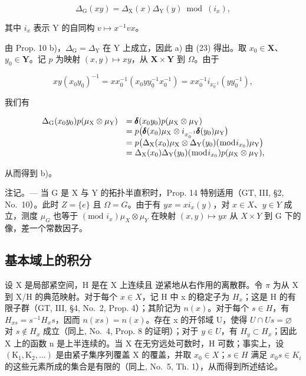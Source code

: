 \[
\Delta_ {\mathrm{G}} (x y) = \Delta_ {\mathrm{X}} (x) \Delta_ {\mathrm{Y}} (y) \bmod (i _ {x}),
\]

其中 \(i_x\) 表示 Y 的自同构 \(v \mapsto x^{-1}vx\)。

由 Prop. 10 b)，\(\Delta_{\mathrm{G}} = \Delta_{\mathrm{Y}}\) 在 Y 上成立，因此 a) 由 (23) 得出。取 \(x_0 \in \mathbf{X}\)、\(y_0 \in \mathbf{Y}\)。记 \(p\) 为映射 \((x, y) \mapsto xy\)，从 \(\mathbf{X} \times \mathbf{Y}\) 到 \(\Omega\)。由于

\[
x y \left(x _ {0} y _ {0}\right) ^ {- 1} = x x _ {0} ^ {- 1} \left(x _ {0} y y _ {0} ^ {- 1} x _ {0} ^ {- 1}\right) = x x _ {0} ^ {- 1} i _ {x _ {0} ^ {- 1}} \left(y y _ {0} ^ {- 1}\right),
\]

我们有

\[
\begin{array}{r l} \Delta_ {\mathrm{G}} (x _ {0} y _ {0}) p (\mu_ {\mathrm{X}} \otimes \mu_ {\mathrm{Y}}) & = \pmb {\delta} (x _ {0} y _ {0}) p (\mu_ {\mathrm{X}} \otimes \mu_ {\mathrm{Y}}) \\ & = p \big (\pmb {\delta} (x _ {0}) \mu_ {\mathrm{X}} \otimes i _ {x _ {0} ^ {- 1}} \pmb {\delta} (y _ {0}) \mu_ {\mathrm{Y}} \big) \\ & = p \big (\Delta_ {\mathrm{X}} (x _ {0}) \mu_ {\mathrm{X}} \otimes \Delta_ {\mathrm{Y}} (y _ {0}) (\bmod i _ {x _ {0}}) \mu_ {\mathrm{Y}} \big) \\ & = \Delta_ {\mathrm{X}} (x _ {0}) \Delta_ {\mathrm{Y}} (y _ {0}) (\bmod i _ {x _ {0}}) p (\mu_ {\mathrm{X}} \otimes \mu_ {\mathrm{Y}}), \end{array}
\]

从而得到 b)。

注记。--- 当 G 是 X 与 Y 的拓扑半直积时，Prop. 14 特别适用（GT, III, §2, No.~10）。此时 \(Z = \{e\}\) 且 \(\Omega = G\)。由于有 \(yx = x i_{x}(y)\)，对 \(x \in X\)、\(y \in Y\) 成立，测度 \(\mu_{G}\) 也等于 \((\text{mod } i_{x})\mu_{X} \otimes \mu_{Y}\) 在映射 \((x, y) \mapsto yx\) 从 \(X \times Y\) 到 G 下的像，差一个常数因子。

\subsection{基本域上的积分}

设 X 是局部紧空间，H 是在 X 上连续且 逆紧地从右作用的离散群。令 \(\pi\) 为从 X 到 X/H 的典范映射。对于每个 \(x \in X\)，记 H 中 x 的稳定子为 \(H_x\)；这是 H 的有限子群（GT, III, §4, No.~2, Prop. 4）；其阶记为 \(n(x)\)。对于每个 \(s \in H\)，有 \(H_{xs} = s^{-1}H_x s\)，因而 \(n(xs) = n(x)\)。存在 x 的开邻域 U，使得 \(U \cap Us = \varnothing\) 对 \(s \notin H_x\) 成立（同上, No.~4, Prop. 8 的证明）；对于 \(y \in U\)，有 \(H_y \subset H_x\)；因此 X 上的函数 n 是上半连续的。当 X 在无穷远处可数时，H 可数；事实上，设 \((\mathrm{K}_1, \mathrm{K}_2, \ldots)\) 是由紧子集序列覆盖 X 的覆盖，并取 \(x_{0} \in X\)；\(s \in H\) 满足 \(x_{0}s \in K_{i}\) 的这些元素所成的集合是有限的（同上, No.~5, Th. 1），从而得到所述结论。

